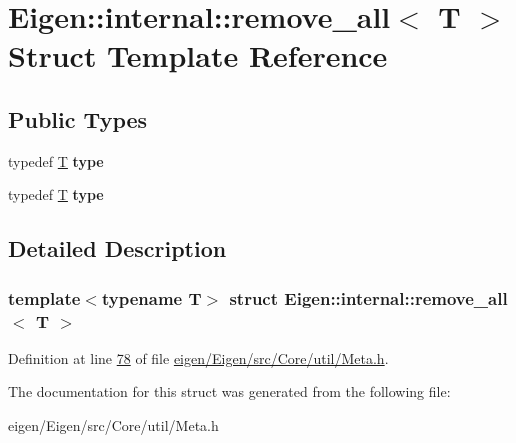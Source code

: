 \hypertarget{struct_eigen_1_1internal_1_1remove__all}{}\section{Eigen\+:\+:internal\+:\+:remove\+\_\+all$<$ T $>$ Struct Template Reference}
\label{struct_eigen_1_1internal_1_1remove__all}
\subsection*{Public Types}
\begin{DoxyCompactItemize}
\item 
\mbox{\label{struct_eigen_1_1internal_1_1remove__all_a5779acf852f62735a7d293d29b18e321}} 
typedef \hyperlink{group___sparse_core___module}{T} {\bfseries type}
\item 
\mbox{\label{struct_eigen_1_1internal_1_1remove__all_a5779acf852f62735a7d293d29b18e321}} 
typedef \hyperlink{group___sparse_core___module}{T} {\bfseries type}
\end{DoxyCompactItemize}


\subsection{Detailed Description}
\subsubsection*{template$<$typename T$>$\newline
struct Eigen\+::internal\+::remove\+\_\+all$<$ T $>$}



Definition at line \hyperlink{eigen_2_eigen_2src_2_core_2util_2_meta_8h_source_l00078}{78} of file \hyperlink{eigen_2_eigen_2src_2_core_2util_2_meta_8h_source}{eigen/\+Eigen/src/\+Core/util/\+Meta.\+h}.



The documentation for this struct was generated from the following file\+:\begin{DoxyCompactItemize}
\item 
eigen/\+Eigen/src/\+Core/util/\+Meta.\+h\end{DoxyCompactItemize}
